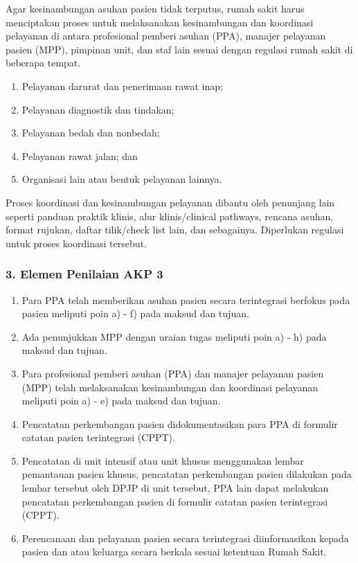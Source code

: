 \documentclass[
]{book}
\providecommand{\tightlist}{%
  \setlength{\itemsep}{0pt}\setlength{\parskip}{0pt}}
\begin{document}
Agar kesinambungan asuhan pasien tidak terputus, rumah sakit harus menciptakan proses untuk melaksanakan kesinambungan dan koordinasi pelayanan di antara profesional pemberi asuhan (PPA), manajer pelayanan pasien (MPP), pimpinan unit, dan staf lain sesuai dengan regulasi rumah sakit di beberapa tempat.

\begin{enumerate}
\def\labelenumi{\alph{enumi}.}
\tightlist
\item
  Pelayanan darurat dan penerimaan rawat inap;
\item
  Pelayanan diagnostik dan tindakan;
\item
  Pelayanan bedah dan nonbedah;
\item
  Pelayanan rawat jalan; dan
\item
  Organisasi lain atau bentuk pelayanan lainnya.
\end{enumerate}

Proses koordinasi dan kesinambungan pelayanan dibantu oleh penunjang lain seperti panduan praktik klinis, alur klinis/clinical pathways, rencana asuhan, format rujukan, daftar tilik/check list lain, dan sebagainya. Diperlukan regulasi untuk proses koordinasi tersebut.

\hypertarget{elemen-penilaian-akp-3}{%
\subsubsection*{3. Elemen Penilaian AKP 3}\label{elemen-penilaian-akp-3}}

\begin{enumerate}
\def\labelenumi{\alph{enumi}.}
\tightlist
\item
  Para PPA telah memberikan asuhan pasien secara terintegrasi berfokus pada pasien meliputi poin a) - f) pada maksud dan tujuan.
\item
  Ada penunjukkan MPP dengan uraian tugas meliputi poin a) - h) pada maksud dan tujuan.
\item
  Para profesional pemberi asuhan (PPA) dan manajer pelayanan pasien (MPP) telah melaksanakan kesinambungan dan koordinasi pelayanan meliputi poin a) - e) pada maksud dan tujuan.
\item
  Pencatatan perkembangan pasien didokumentasikan para PPA di formulir catatan pasien terintegrasi (CPPT).
\item
  Pencatatan di unit intensif atau unit khusus menggunakan lembar pemantauan pasien khusus, pencatatan perkembangan pasien dilakukan pada lembar tersebut oleh DPJP di unit tersebut, PPA lain dapat melakukan pencatatan perkembangan pasien di formulir catatan pasien terintegrasi (CPPT).
\item
  Perencanaan dan pelayanan pasien secara terintegrasi diinformasikan kepada pasien dan atau keluarga secara berkala sesuai ketentuan Rumah Sakit.
\end{enumerate}
\end{document}
